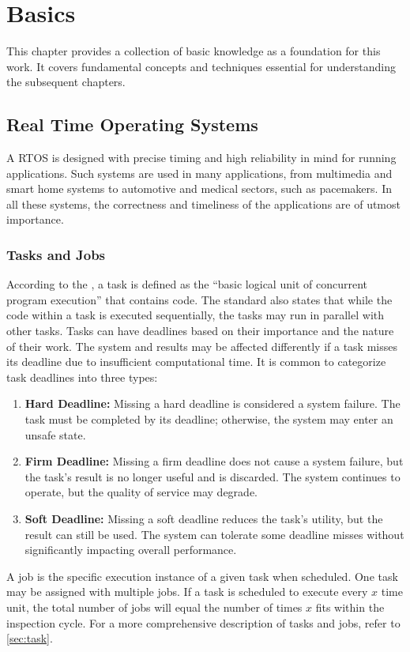 \chapter{Basics}\label{ch:basics}
This chapter provides a collection of basic knowledge as a foundation for this work. It covers fundamental concepts and techniques essential for understanding the subsequent chapters.

\section{Real Time Operating Systems}\label{sec:rtos}
A \ac{RTOS} is designed with precise timing and high reliability in mind for running applications\cite{stankovicRealtimeOperatingSystems2004}. Such systems are used in many applications, from multimedia and smart home systems to automotive and medical sectors, such as pacemakers\cite{hambardeSurveyRealTime2014}. In all these systems, the correctness and timeliness of the applications are of utmost importance\cite{hambardeSurveyRealTime2014}.

\subsection{Tasks and Jobs}\label{sec:tasks_and_jobs}
According to the \textcite{IEEEStandardRealTime}, a task is defined as the ``basic logical unit of concurrent program execution'' that contains code. The standard also states that while the code within a task is executed sequentially, the tasks may run in parallel with other tasks. Tasks can have deadlines based on their importance and the nature of their work. The system and results may be affected differently if a task misses its deadline due to insufficient computational time. It is common to categorize task deadlines into three types\cite{dengSchedulingRealtimeApplications1997,abeniIntegratingMultimediaApplications1998,shindeComparisonRealTime2017}:
\begin{enumerate}
	\item \textbf{Hard Deadline:}
	      Missing a hard deadline is considered a system failure. The task must be completed by its deadline; otherwise, the system may enter an unsafe state.
	\item \textbf{Firm Deadline:}
	      Missing a firm deadline does not cause a system failure, but the task's result is no longer useful and is discarded. The system continues to operate, but the quality of service may degrade.
	\item \textbf{Soft Deadline:}
	      Missing a soft deadline reduces the task's utility, but the result can still be used. The system can tolerate some deadline misses without significantly impacting overall performance.
\end{enumerate}
A job is the specific execution instance of a given task when scheduled. One task may be assigned with multiple jobs. If a task is scheduled to execute every $x$ time unit, the total number of jobs will equal the number of times $x$ fits within the inspection cycle. For a more comprehensive description of tasks and jobs, refer to \cref{sec:task}.


